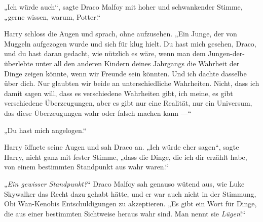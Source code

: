 „Ich würde auch“, sagte Draco Malfoy mit hoher und schwankender Stimme, „gerne wissen, warum, Potter.“

Harry schloss die Augen und sprach, ohne aufzusehen.
„Ein Junge, der von Muggeln aufgezogen wurde und sich für klug hielt. Du hast mich gesehen, Draco, und du hast daran gedacht, wie nützlich es wäre, wenn man dem Jungen-der-überlebte unter all den anderen Kindern deines Jahrgangs die Wahrheit der Dinge zeigen könnte, wenn wir Freunde sein könnten. Und ich dachte dasselbe über dich. Nur glaubten wir beide an unterschiedliche Wahrheiten. Nicht, dass ich damit sagen will, dass es verschiedene Wahrheiten gibt, ich meine, es gibt verschiedene Überzeugungen, aber es gibt nur eine Realität, nur ein Universum, das diese Überzeugungen wahr oder falsch machen kann —“

„Du hast mich angelogen.“

Harry öffnete seine Augen und sah Draco an.
„Ich würde eher sagen“, sagte Harry, nicht ganz mit fester Stimme, „dass die Dinge, die ich dir erzählt habe, von einem bestimmten Standpunkt aus wahr waren.“

„\emph{Ein gewisser Standpunkt?}“
Draco Malfoy sah genauso wütend aus, wie Luke Skywalker das Recht dazu gehabt hätte, und er war auch nicht in der Stimmung, Obi Wan-Kenobis Entschuldigungen zu akzeptieren.
„Es gibt ein Wort für Dinge, die aus einer bestimmten Sichtweise heraus wahr sind. Man nennt sie \emph{Lügen}!“

